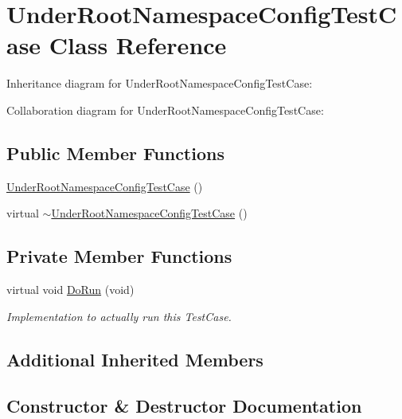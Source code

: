 \hypertarget{classUnderRootNamespaceConfigTestCase}{}\section{Under\+Root\+Namespace\+Config\+Test\+Case Class Reference}
\label{classUnderRootNamespaceConfigTestCase}


Inheritance diagram for Under\+Root\+Namespace\+Config\+Test\+Case\+:


Collaboration diagram for Under\+Root\+Namespace\+Config\+Test\+Case\+:
\subsection*{Public Member Functions}
\begin{DoxyCompactItemize}
\item 
\hyperlink{classUnderRootNamespaceConfigTestCase_a8960de4cc1eebe7833e26afefe4d35fb}{Under\+Root\+Namespace\+Config\+Test\+Case} ()
\item 
virtual \hyperlink{classUnderRootNamespaceConfigTestCase_a6957b895704e22e4c34c9ead5c5627c3}{$\sim$\+Under\+Root\+Namespace\+Config\+Test\+Case} ()
\end{DoxyCompactItemize}
\subsection*{Private Member Functions}
\begin{DoxyCompactItemize}
\item 
virtual void \hyperlink{classUnderRootNamespaceConfigTestCase_af551e62fce477d98e1d7575224177b65}{Do\+Run} (void)
\begin{DoxyCompactList}\small\item\em Implementation to actually run this Test\+Case. \end{DoxyCompactList}\end{DoxyCompactItemize}
\subsection*{Additional Inherited Members}


\subsection{Constructor \& Destructor Documentation}
